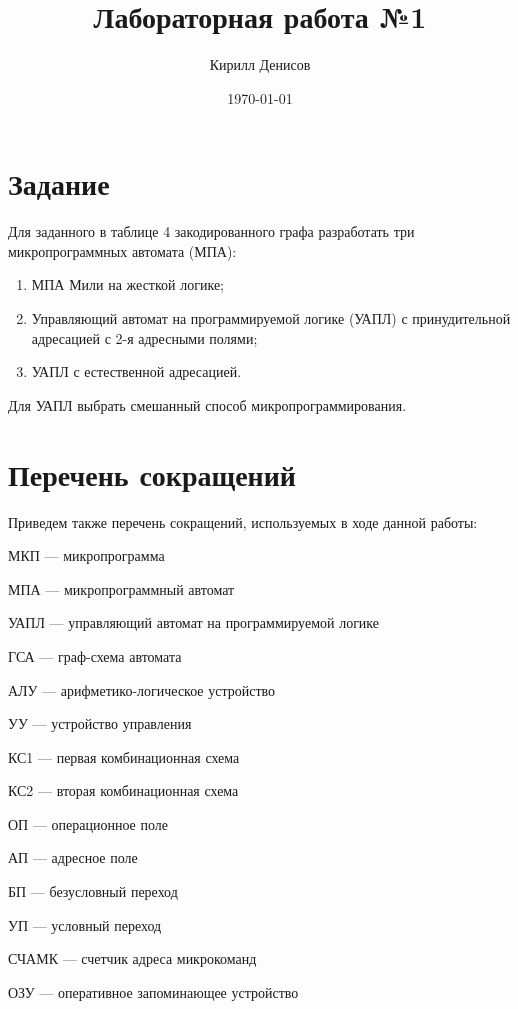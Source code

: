 \documentclass[a4paper,14pt]{extarticle}
\author{Кирилл Денисов}
\title{Лабораторная работа №1}
\date{\today}
\newcommand{\pathToCommonFolder}{/home/denilai/Documents/repos/latex/Common}
\begin{document}
	\thispagestyle{empty}
	
	\newpage
	\newpage

	
	\section*{Задание}
	Для заданного в таблице 4 закодированного графа разработать три микропрограммных автомата (МПА):
	\begin{enumerate}
		\item МПА Мили на жесткой логике;
		\item Управляющий автомат на программируемой
		логике (УАПЛ) с принудительной адресацией с 2-я адресными полями;
		\item УАПЛ с естественной адресацией. 
	\end{enumerate}
	Для УАПЛ выбрать смешанный способ микропрограммирования.
	
	

	
\section*{Перечень сокращений}
	Приведем также перечень сокращений, используемых в ходе данной работы:
	
	МКП --- микропрограмма
	
	МПА --- микропрограммный автомат
	
	УАПЛ --- управляющий автомат на программируемой логике
	
	ГСА --- граф-схема автомата
	
	АЛУ --- арифметико-логическое устройство
	
	УУ --- устройство управления
	
	КС1 --- первая комбинационная схема 
	
	КС2 --- вторая комбинационная схема 
	
	ОП --- операционное поле
	
	АП --- адресное поле 
	
	БП --- безусловный переход
	
	УП --- условный переход
	
	
	
	
	
	СЧАМК --- счетчик адреса микрокоманд
	
	ОЗУ  --- оперативное запоминающее устройство
	
\end{document}
